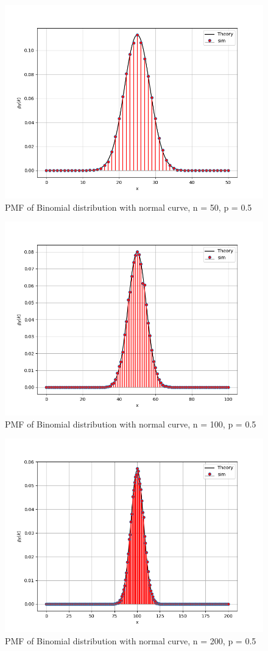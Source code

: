 \documentclass{beamer}
\theoremstyle{remark}
\numberwithin{equation}{section}
\begin{document}
\begin{frame}
\begin{figure}[h!]
   \centering
   \includegraphics[width=0.8\columnwidth]{figs/gausscomp1.png}
   \caption{PMF of Binomial distribution with normal curve, n = 50, p = 0.5}
   \label{stemplot}
\end{figure}
\end{frame}
\begin{frame}
\begin{figure}[h!]
   \centering
   \includegraphics[width=0.8\columnwidth]{figs/gausscomp2.png}
   \caption{PMF of Binomial distribution with normal curve, n = 100, p = 0.5}
   \label{stemplot}
\end{figure}
\end{frame}
\begin{frame}
\begin{figure}[h!]
   \centering
   \includegraphics[width=0.8\columnwidth]{figs/gausscomp3.png}
   \caption{PMF of Binomial distribution with normal curve, n = 200, p = 0.5}
   \label{stemplot}
\end{figure}
\end{frame}
\end{document}
